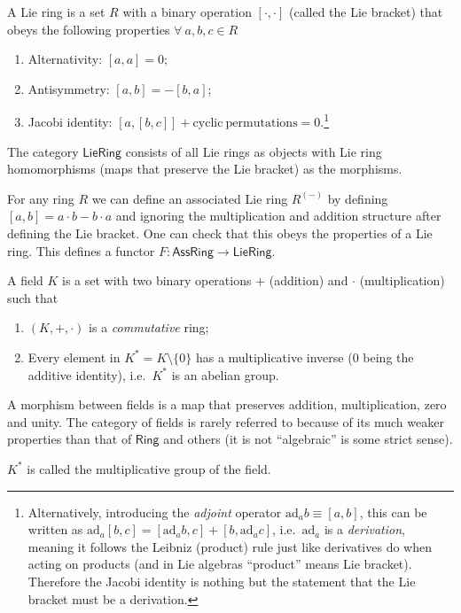 \begin{defn}
A Lie ring is a set $R$ with a binary operation $[\cdot,\cdot]$
(called the \textsf{Lie bracket}) that obeys the following properties
$\forall~a,b,c\in R$ 
\begin{enumerate}
\item Alternativity: $[a,a]=0$;
\item Antisymmetry: $[a,b]=-[b,a]$; 
\item Jacobi identity: $[a,[b,c]]+\mathrm{cyclic~permutations}=0$.\footnote{Alternatively, introducing the \emph{adjoint} operator $\mathrm{ad}_{a}b\equiv\left[a,b\right]$,
this can be written as $\mathrm{ad}_{a}\left[b,c\right]=\left[\mathrm{ad}_{a}b,c\right]+\left[b,\mathrm{ad}_{a}c\right]$,
i.e.\ $\mathrm{ad}_{a}$ is a \emph{derivation}, meaning
it follows the Leibniz (product) rule just like derivatives do when
acting on products (and in Lie algebras ``product'' means Lie bracket).
Therefore the Jacobi identity is nothing but the statement that the
Lie bracket must be a derivation.}
\end{enumerate}
The category $\mathsf{LieRing}$ consists of all Lie rings as objects
with Lie ring homomorphisms (maps that preserve the Lie bracket) as
the morphisms.

\end{defn}
\begin{example}
For any ring $R$ we can define an associated Lie ring $R^{(-)}$
by defining $[a,b]=a\cdot b-b\cdot a$ and ignoring the multiplication
and addition structure after defining the Lie bracket. One can check
that this obeys the properties of a Lie ring. This defines a functor
$F:\mathsf{AssRing}\rightarrow\mathsf{LieRing}$.
\end{example}
\begin{defn}[Fields]
A field $K$ is a set with two binary operations $+$ (addition)
and $\cdot$ (multiplication) such that
\begin{enumerate}
\item $(K,+,\cdot)$ is a \emph{commutative} ring;
\item Every element in $K^{\ast}=K\setminus\{0\}$ has a multiplicative
inverse ($0$ being the additive identity), i.e.\ $K^{\ast}$ is an
abelian group.
\end{enumerate}
A morphism between fields is a map that preserves addition, multiplication,
zero and unity. The category of fields is rarely referred to because
of its much weaker properties than that of $\mathsf{Ring}$ and others
(it is not ``algebraic'' is some strict sense).

$K^{\ast}$ is called the multiplicative group of the field. 
\end{defn}
